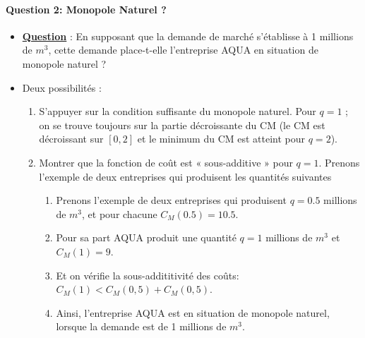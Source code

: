  \begin{frame}
 [allowframebreaks]{\insertsection}
 \framesubtitle{Question 2: Monopole Naturel ?}
 \begin{itemize}
 \item \underline{\textbf{Question}} : En supposant que la demande de marché s'établisse à 1 millions de $m^3$, cette demande place-t-elle l’entreprise AQUA en situation de monopole naturel ? 
\item Deux possibilités :
\begin{enumerate}
\item S’appuyer sur la condition suffisante du monopole naturel. Pour $q=1$ ; on se trouve toujours sur la partie décroissante du CM
 (le CM est décroissant sur $[0, 2]$ et le minimum du CM est atteint pour $q = 2$).
 \item Montrer que la fonction de coût est « sous-additive » pour $q=1$. Prenons l’exemple de deux entreprises qui produisent les quantités suivantes
\begin{enumerate}[$\cdot$]
\item Prenons l’exemple de deux entreprises qui produisent $q=0.5$ millions de $m^3$, et pour chacune $C_M(0.5) = 10.5$.
\item Pour sa part  AQUA produit une quantité $q=1$ millions de $m^3$ et  $C_M(1) = 9$.
\item Et on vérifie la sous-addititivité des coûts:  $C_M(1)<C_M(0,5)+C_M(0,5)$.
\item Ainsi, l’entreprise AQUA est en situation de monopole naturel, lorsque la demande est de 1 millions de $m^3$.
\end{enumerate}
\end{enumerate}
 \end{itemize}
 \end{frame}
 
